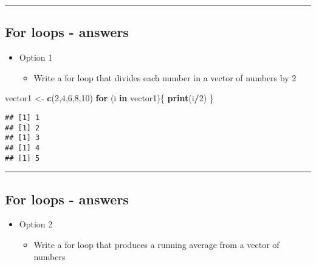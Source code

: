 \documentclass[]{article}
\newenvironment{Shaded}{\begin{snugshade}}{\end{snugshade}}
\newcommand{\ControlFlowTok}[1]{\textcolor[rgb]{0.13,0.29,0.53}{\textbf{#1}}}
\newcommand{\DecValTok}[1]{\textcolor[rgb]{0.00,0.00,0.81}{#1}}
\newcommand{\KeywordTok}[1]{\textcolor[rgb]{0.13,0.29,0.53}{\textbf{#1}}}
\newcommand{\NormalTok}[1]{#1}
\newcommand{\OperatorTok}[1]{\textcolor[rgb]{0.81,0.36,0.00}{\textbf{#1}}}
\newcommand{\StringTok}[1]{\textcolor[rgb]{0.31,0.60,0.02}{#1}}
\providecommand{\tightlist}{%
  \setlength{\itemsep}{0pt}\setlength{\parskip}{0pt}}
\begin{document}
\begin{center}\rule{0.5\linewidth}{\linethickness}\end{center}

\hypertarget{for-loops---answers}{%
\subsection{For loops - answers}\label{for-loops---answers}}

\begin{itemize}
\tightlist
\item
  Option 1

  \begin{itemize}
  \tightlist
  \item
    Write a for loop that divides each number in a vector of numbers by
    2
  \end{itemize}
\end{itemize}

\begin{Shaded}
\begin{Highlighting}[]
\NormalTok{vector1 <-}\StringTok{ }\KeywordTok{c}\NormalTok{(}\DecValTok{2}\NormalTok{,}\DecValTok{4}\NormalTok{,}\DecValTok{6}\NormalTok{,}\DecValTok{8}\NormalTok{,}\DecValTok{10}\NormalTok{)}
\ControlFlowTok{for}\NormalTok{ (i }\ControlFlowTok{in}\NormalTok{ vector1)\{}
  \KeywordTok{print}\NormalTok{(i}\OperatorTok{/}\DecValTok{2}\NormalTok{)}
\NormalTok{\}}
\end{Highlighting}
\end{Shaded}

\begin{verbatim}
## [1] 1
## [1] 2
## [1] 3
## [1] 4
## [1] 5
\end{verbatim}

\begin{center}\rule{0.5\linewidth}{\linethickness}\end{center}

\hypertarget{for-loops---answers-1}{%
\subsection{For loops - answers}\label{for-loops---answers-1}}

\begin{itemize}
\tightlist
\item
  Option 2

  \begin{itemize}
  \tightlist
  \item
    Write a for loop that produces a running average from a vector of
    numbers
  \end{itemize}
\end{itemize}
\end{document}
